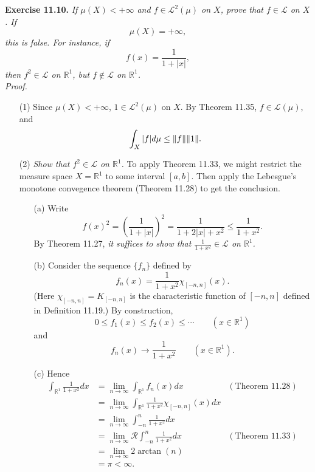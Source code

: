 \documentclass{article}
\begin{document}



\textbf{Exercise 11.10.}
\emph{If $\mu(X) < +\infty$ and $f \in \mathscr{L}^2(\mu)$ on $X$,
prove that $f \in \mathscr{L}$ on $X$.
If
\[
  \mu(X) = +\infty,
\]
this is false. For instance, if
\[
  f(x) = \frac{1}{1+|x|},
\]
then $f^2 \in \mathscr{L}$ on $\mathbb{R}^1$,
but $f \not\in \mathscr{L}$ on $\mathbb{R}^1$.} \\

\emph{Proof.}
\begin{enumerate}
\item[(1)]
Since $\mu(X) < +\infty$, $1 \in \mathscr{L}^2(\mu)$ on $X$.
By Theorem 11.35, $f \in \mathscr{L}(\mu)$, and
\[
  \int_X |f| d\mu
  \leq \norm{f} \norm{1}.
\]

\item[(2)]
  \emph{Show that $f^2 \in \mathscr{L}$ on $\mathbb{R}^1$.}
  To apply Theorem 11.33,
  we might restrict the measure space $X = \mathbb{R}^1$ to some interval $[a,b]$.
  Then apply the Lebesgue's monotone convegence theorem (Theorem 11.28) to get the conclusion.
  \begin{enumerate}
  \item[(a)]
  Write
  \[
    f(x)^2
    = \left(\frac{1}{1+|x|}\right)^2
    = \frac{1}{1 + 2|x| + x^2}
    \leq \frac{1}{1+x^2}.
  \]
  By Theorem 11.27,
  \emph{it suffices to show that $\frac{1}{1+x^2} \in \mathscr{L}$ on $\mathbb{R}^1$.}

  \item[(b)]
  Consider the sequence $\{f_n\}$ defined by
  \[
    f_n(x) = \frac{1}{1+x^2} \chi_{[-n,n]}(x).
  \]
  (Here $\chi_{[-n,n]} = K_{[-n,n]}$ is the characteristic function of $[-n,n]$
  defined in Definition 11.19.)
  By construction,
  \[
    0 \leq f_1(x) \leq f_2(x) \leq \cdots
    \qquad
    (x \in \mathbb{R}^1)
  \]
  and
  \[
    f_n(x) \to \frac{1}{1+x^2}
    \qquad
    (x \in \mathbb{R}^1).
  \]

  \item[(c)]
  Hence
  \begin{align*}
    \int_{\mathbb{R}^1} \frac{1}{1+x^2} dx
    &= \lim_{n \to \infty} \int_{\mathbb{R}^1} f_n(x) dx
      &(\text{Theorem 11.28}) \\
    &= \lim_{n \to \infty} \int_{\mathbb{R}^1} \frac{1}{1+x^2} \chi_{[-n,n]}(x) dx \\
    &= \lim_{n \to \infty} \int_{-n}^{n} \frac{1}{1+x^2} dx \\
    &= \lim_{n \to \infty} \mathscr{R}\int_{-n}^{n} \frac{1}{1+x^2} dx
      &(\text{Theorem 11.33}) \\
    &= \lim_{n \to \infty} 2 \arctan(n) \\
    &= \pi < \infty.
  \end{align*}
  \end{enumerate}


\end{enumerate}
\end{document}
